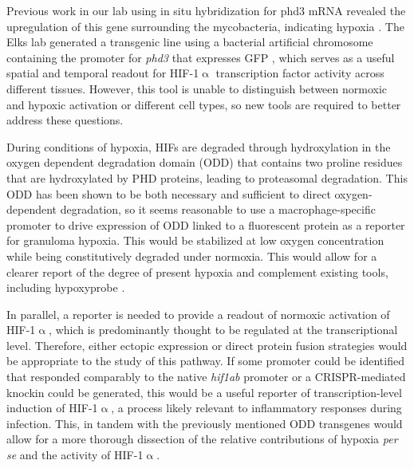 Previous work in our lab using in situ hybridization for phd3 mRNA revealed the upregulation of this gene surrounding the mycobacteria, indicating hypoxia \citep{Oehlers2015}. The Elks lab generated a transgenic line using a bacterial artificial chromosome containing the promoter for \textit{phd3} that expresses GFP \citep{Santhakuma2012}, which serves as a useful spatial and temporal readout for HIF-1$\upalpha$ transcription factor activity across different tissues. However, this tool is unable to distinguish between normoxic and hypoxic activation or different cell types, so new tools are required to better address these questions.

During conditions of hypoxia, HIFs are degraded through hydroxylation in the oxygen dependent degradation domain (ODD) that contains two proline residues that are hydroxylated by PHD proteins, leading to proteasomal degradation. This ODD has been shown to be both necessary and sufficient to direct oxygen-dependent degradation, so it seems reasonable to use a macrophage-specific promoter to drive expression of ODD linked to a fluorescent protein as a reporter for granuloma hypoxia. This would be stabilized at low oxygen concentration while being constitutively degraded under normoxia. This would allow for a clearer report of the degree of present hypoxia and complement existing tools, including hypoxyprobe \citep{Cousins2016, Huang1998}.

In parallel, a reporter is needed to provide a readout of normoxic activation of HIF-1$\upalpha$, which is predominantly thought to be regulated at the transcriptional level. Therefore, either ectopic expression or direct protein fusion strategies would be appropriate to the study of this pathway. If some promoter could be identified that responded comparably to the native \textit{hif1ab} promoter or a CRISPR-mediated knockin could be generated, this would be a useful reporter of transcription-level induction of HIF-1$\upalpha$, a process likely relevant to inflammatory responses during infection.  This, in tandem with the previously mentioned ODD transgenes would allow for a more thorough dissection of the relative contributions of hypoxia \textit{per se} and the activity of HIF-1$\upalpha$.

